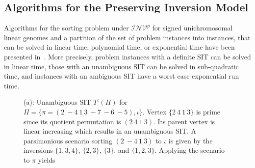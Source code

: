 \documentclass{svmult}
\newcommand{\m}[1]{\mathcal{#1}}
\begin{document}
\subsection{Algorithms for the Preserving Inversion Model}
\label{sec:rev_p_sorting}

Algorithms for the sorting problem under $\m{INV}^p$ for signed unichromosomal
linear genomes and a partition of the set of problem instances
into instances, that can be solved in linear time, polynomial time, or
exponential time have been presented in~\cite{Berard_2007}. More precisely, problem instances with a definite SIT can be solved in linear time, those with an unambiguous SIT can be solved in sub-quadratic time, and instances with an ambiguous SIT have a worst case exponential run time.

\begin{figure}
	\begin{center}
		\quad
	\end{center}
	\caption{(a): Unambiguous SIT ${T}^\iota(\Pi)$ for
	$\Pi=\{\pi=(2~-{4}~1~3~-{7}~-{6}~-{5}),\iota\}$.
	Vertex $\{2~4~1~3\}$ is prime since its quotient
	permutation is $(2~4~1~3)$.
	Its parent vertex is linear increasing which results in an unambiguous SIT. A parsimonious scenario
	sorting $(2~-{4}~1~3)$ to $\iota$ is given by the inversions
	$\{1,3,4\}$, $\{2,3\}$, $\{3\}$, and $\{1,2,3\}$.
	Applying the scenario to $\pi$ yields
}
\end{figure}
\end{document}
